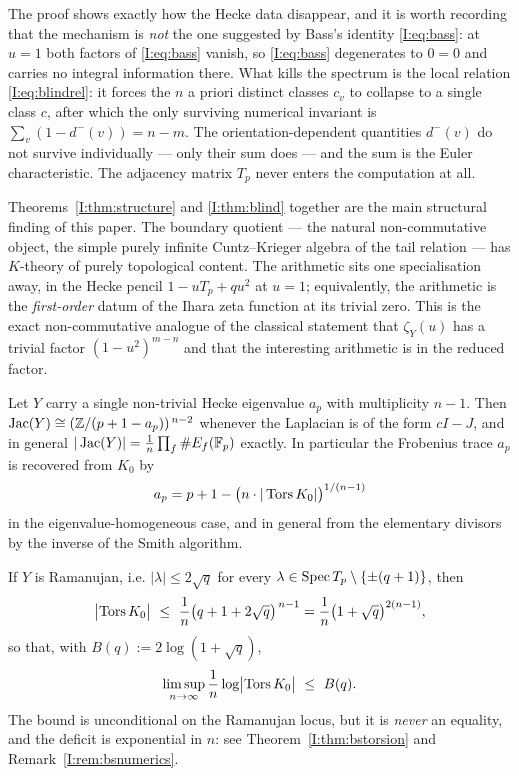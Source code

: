 \begin{remark}\label{I:rem:wherespectrum}
The proof shows exactly how the Hecke data disappear, and it is worth recording that the
mechanism is \emph{not} the one suggested by Bass's identity \eqref{I:eq:bass}: at $u=1$
both factors of \eqref{I:eq:bass} vanish, so \eqref{I:eq:bass} degenerates to $0=0$ and
carries no integral information there. What kills the spectrum is the local relation
\eqref{I:eq:blindrel}: it forces the $n$ a priori distinct classes $c_v$ to collapse to a
single class $c$, after which the only surviving numerical invariant is
$\sum_v(1-d^-(v))=n-m$. The orientation-dependent quantities $d^-(v)$ do not survive
individually --- only their sum does --- and the sum is the Euler characteristic. The
adjacency matrix $T_p$ never enters the computation at all.
\end{remark}

\begin{remark}\label{I:rem:dichotomy}
Theorems~\ref{I:thm:structure} and \ref{I:thm:blind} together are the main structural finding
of this paper. The boundary quotient --- the natural non-commutative object, the simple
purely infinite Cuntz--Krieger algebra of the tail relation --- has $K$-theory of purely
topological content. The arithmetic sits one specialisation away, in the Hecke pencil
$1-uT_p+qu^2$ at $u=1$; equivalently, the arithmetic is the \emph{first-order} datum of
the Ihara zeta function at its trivial zero. This is the exact non-commutative analogue
of the classical statement that $\zeta_Y(u)$ has a trivial factor $(1-u^2)^{m-n}$ and
that the interesting arithmetic is in the reduced factor.
\end{remark}

\begin{corollary}\label{I:cor:frobenius}
Let $Y$ carry a single non-trivial Hecke eigenvalue $a_p$ with multiplicity $n-1$. Then
$\operatorname{Jac}(Y)\cong(\mathbb{Z}/(p+1-a_p))^{\,n-2}$ whenever the Laplacian is of the form
$cI-J$, and in general $|\operatorname{Jac}(Y)|=\frac1n\prod_f\#E_f(\mathbb{F}_p)$ exactly. In particular the
Frobenius trace $a_p$ is recovered from $K_0$ by
\[
a_p=p+1-\bigl(n\cdot|\operatorname{Tors} K_0|\bigr)^{1/(n-1)}
\]
in the eigenvalue-homogeneous case, and in general from the elementary divisors by the
inverse of the Smith algorithm.
\end{corollary}

\begin{corollary}\label{I:cor:ramanujan}
If $Y$ is Ramanujan, i.e. $|\lambda|\le2\sqrt q$ for every
$\lambda\in\operatorname{Spec} T_p\setminus\{\pm(q+1)\}$, then
\[
\bigl|\Tors K_0\bigr|\ \le\ \frac1n\bigl(q+1+2\sqrt q\bigr)^{\,n-1}
=\frac1n\bigl(1+\sqrt q\bigr)^{2(n-1)},
\]
so that, with $B(q):=2\log(1+\sqrt q)$,
\[
\limsup_{n\to\infty}\frac1n\log\bigl|\operatorname{Tors} K_0\bigr|\ \le\ B(q).
\]
The bound is unconditional on the Ramanujan locus, but it is \emph{never} an equality,
and the deficit is exponential in $n$: see Theorem~\ref{I:thm:bstorsion} and
Remark~\ref{I:rem:bsnumerics}.
\end{corollary}

